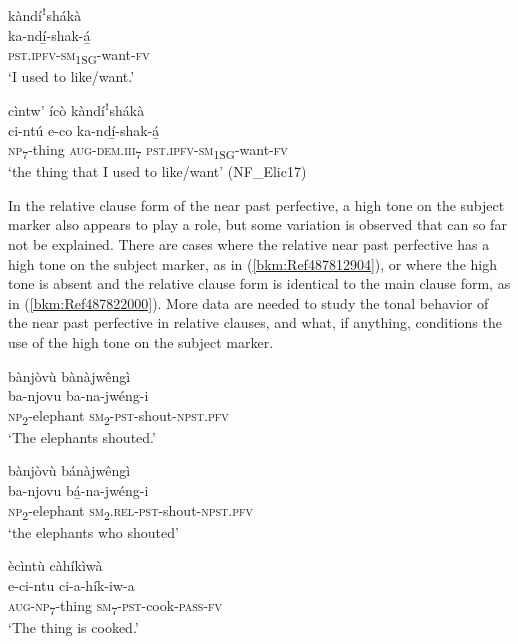 \ea
\label{bkm:Ref99105705}
\glll kàndíꜝshákà\\
ka-ndí̲-shak-á̲\\
\textsc{pst}.\textsc{ipfv}-\textsc{sm}\textsubscript{1SG}-want-\textsc{fv}\\
\glt ‘I used to like/want.’
\z

\ea
\label{bkm:Ref99992493}
cìntw’ ícò kàndíꜝshákà\\
\gll ci-ntú    e-co    ka-ndí̲-shak-á̲\\
\textsc{np}\textsubscript{7}-thing  \textsc{aug}-\textsc{dem}.\textsc{iii}\textsubscript{7}  \textsc{pst}.\textsc{ipfv}-\textsc{sm}\textsubscript{1SG}-want-\textsc{fv}\\
\glt ‘the thing that I used to like/want’ (NF\_Elic17)
\z

In the relative clause form of the near past perfective, a high tone on the subject marker also appears to play a role, but some variation is observed that can so far not be explained. There are cases where the relative near past perfective has a high tone on the subject marker, as in (\ref{bkm:Ref487812904}), or where the high tone is absent and the relative clause form is identical to the main clause form, as in (\ref{bkm:Ref487822000}). More data are needed to study the tonal behavior of the near past perfective in relative clauses, and what, if anything, conditions the use of the high tone on the subject marker.

\ea
\label{bkm:Ref487812904}
\ea
bànjòvù bànàjwêngì\\
\gll ba-njovu    ba-na-jwéng-i\\
\textsc{np}\textsubscript{2}-elephant    \textsc{sm}\textsubscript{2}-\textsc{pst}-shout-\textsc{npst}.\textsc{pfv}\\
\glt ‘The elephants shouted.’

\ex
bànjòvù bánàjwêngì\\
\gll ba-njovu    bá̲-na-jwéng-i\\
\textsc{np}\textsubscript{2}-elephant    \textsc{sm}\textsubscript{2}.\textsc{rel}-\textsc{pst}-shout-\textsc{npst}.\textsc{pfv}\\
\glt ‘the elephants who shouted’
\z\z

\ea
\label{bkm:Ref487822000}
\ea
ècìntù càhíkìwà\\
\gll e-ci-ntu    ci-a-hík-iw-a\\
\textsc{aug}-\textsc{np}\textsubscript{7}-thing  \textsc{sm}\textsubscript{7}-\textsc{pst}-cook-\textsc{pass}-\textsc{fv}\\
\glt ‘The thing is cooked.’

